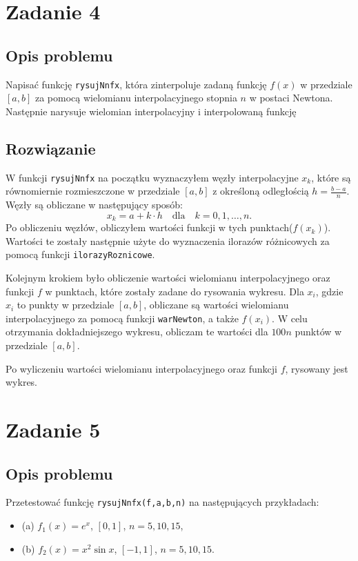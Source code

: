 \documentclass{article}
\begin{document}
\section{Zadanie 4}
\subsection{Opis problemu}
Napisać funkcję \texttt{rysujNnfx}, która zinterpoluje zadaną funkcję $f(x)$ w przedziale $[a, b]$ za pomocą wielomianu interpolacyjnego stopnia $n$ w postaci Newtona.
Następnie narysuje wielomian interpolacyjny i interpolowaną funkcję

\subsection{Rozwiązanie}
W funkcji \texttt{rysujNnfx} na początku wyznaczyłem węzły interpolacyjne \( x_k \), które są równomiernie rozmieszczone w przedziale \( [a, b] \) z określoną odległością \( h = \frac{b - a}{n} \).
Węzły są obliczane w następujący sposób:
\[
x_k = a + k \cdot h \quad \text{dla} \quad k = 0, 1, \dots, n.
\]
Po obliczeniu węzłów, obliczyłem wartości funkcji w tych punktach(\( f(x_k) \)).
Wartości te zostały następnie użyte do wyznaczenia ilorazów różnicowych za pomocą funkcji \texttt{ilorazyRoznicowe}.

Kolejnym krokiem było obliczenie wartości wielomianu interpolacyjnego oraz funkcji \( f \) w punktach, które zostały zadane do rysowania wykresu.
Dla \( x_i \), gdzie \( x_i \) to punkty w przedziale \( [a, b] \), obliczane są wartości wielomianu interpolacyjnego za pomocą funkcji \texttt{warNewton}, a także \( f(x_i) \).
W celu otrzymania dokładniejszego wykresu, obliczam te wartości dla \( 100 n \) punktów w przedziale \( [a, b] \).

Po wyliczeniu wartości wielomianu interpolacyjnego oraz funkcji \( f \), rysowany jest wykres.

\section{Zadanie 5}
\subsection{Opis problemu}
Przetestować funkcję \texttt{rysujNnfx(f,a,b,n)} na następujących przykładach:
\begin{itemize}
    \item (a) $f_1(x) = e^x$, $[0, 1]$, $n = 5, 10, 15$,
    \item (b) $f_2(x) = x^2 \sin x$, $[-1, 1]$, $n = 5, 10, 15$.
\end{itemize}
\end{document}
